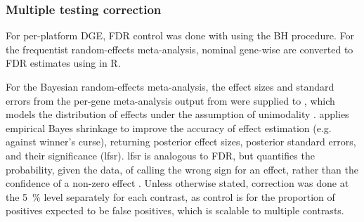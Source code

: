 \subsubsection{Multiple testing correction}
\label{subsubsec:hird_dge_multipleTestingCorrection}

%
For per-platform \gls{DGE}, \gls{FDR} control was done with  using the \gls{BH} procedure.
For the frequentist random-effects meta-analysis, nominal gene-wise \pvalues{} are converted to \gls{FDR} estimates using  in R.

%
For the Bayesian random-effects meta-analysis, 
the effect sizes and standard errors from the per-gene meta-analysis output from  were supplied to ,
which models the distribution of effects under the assumption of unimodality \autocite{stephens2016FalseDiscoveryRates}.
 applies empirical Bayes shrinkage to improve the accuracy of effect estimation (e.g. against winner's curse),
returning posterior effect sizes, posterior standard errors, and their significance (\gls{lfsr}).
\gls{lfsr} is analogous to \gls{FDR}, but quantifies the probability, given the data, of calling the wrong sign for an effect,
rather than the confidence of a non-zero effect \autocite{stephens2016FalseDiscoveryRates}.
Unless otherwise stated, correction was done at the \SI{5}{\percent} level separately for each contrast,
as control is for the proportion of positives expected to be false positives,
which is scalable to multiple contrasts.

